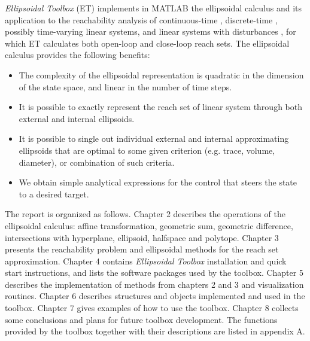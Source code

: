 {\it Ellipsoidal Toolbox} (ET) implements in MATLAB
the ellipsoidal calculus \cite{kurvalyi}
and its application to the reachability analysis of continuous-time
\cite{kurvar}, discrete-time \cite{pvak}, possibly time-varying linear systems,
and linear systems with disturbances \cite{kurvar2},
for which ET calculates both open-loop and close-loop reach sets.
The ellipsoidal calculus provides the following benefits:
\begin{itemize}
\item The complexity of the
ellipsoidal representation is quadratic in the dimension of
the state space, and linear in the number of time steps.
\item It is possible to exactly represent the reach set of
linear system through both external and internal ellipsoids.
\item It is possible to single out individual external and internal
approximating ellipsoids that are optimal to some given criterion
(e.g. trace, volume, diameter), or combination of such criteria.
\item We obtain simple analytical expressions for the control
that steers the state to a desired target.
\end{itemize}
The report is organized as follows.
\newline
Chapter 2 describes the operations of the
ellipsoidal calculus: affine transformation, geometric sum,
geometric difference, intersections with
hyperplane, ellipsoid, halfspace and polytope.
\newline
Chapter 3 presents the reachability problem and ellipsoidal methods for
the reach set approximation.
\newline
Chapter 4 contains {\it Ellipsoidal Toolbox} installation and quick start
instructions, and lists the software packages used by the toolbox.
\newline
Chapter 5 describes the implementation of methods from chapters 2 and 3
and visualization routines.
\newline
Chapter 6 describes structures and objects implemented and
used in the toolbox.
\newline
Chapter 7 gives examples of how to use the toolbox.
\newline
Chapter 8 collects some conclusions and plans for future toolbox development.
\newline
The functions provided by the toolbox together with their descriptions
are listed in appendix A.